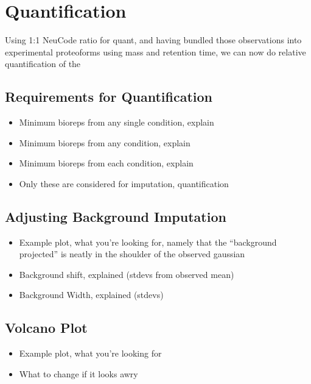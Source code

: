 
\section{Quantification}
Using 1:1 NeuCode ratio for quant, and having bundled those observations into experimental proteoforms using mass and retention time, we can now do relative quantification of the 

\subsection{Requirements for Quantification}
\begin{itemize}
	\item Minimum bioreps from any single condition, explain
	\item Minimum bioreps from any condition, explain
	\item Minimum bioreps from each condition, explain
	\item Only these are considered for imputation, quantification
\end{itemize}

\subsection{Adjusting Background Imputation}
\begin{itemize}
	\item Example plot, what you're looking for, namely that the ``background projected'' is neatly in the shoulder of the observed gaussian
	\item Background shift, explained (stdevs from observed mean)
	\item Background Width, explained (stdevs)
\end{itemize}

\subsection{Volcano Plot}
\begin{itemize}
	\item Example plot, what you're looking for
	\item What to change if it looks awry
\end{itemize}

